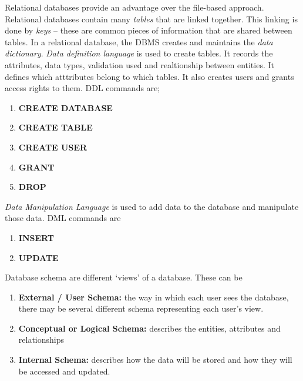 \documentclass{article}
\begin{document}
\noindent Relational databases provide an advantage over the file-based
approach. Relational databases contain many \textit{tables} that are linked
together. This linking is done by \textit{keys} -- these are common pieces of
information that are shared between tables. In a relational database, the DBMS
creates and maintains the \textit{data dictionary}. \textit{Data definition
language} is used to create tables. It records the attributes, data types,
validation used and realtionship between entities. It defines which atttributes
belong to which tables. It also creates users and grants access rights to them.
DDL commands are;\begin{enumerate}

    \item \textbf{CREATE DATABASE}
    
    \item \textbf{CREATE TABLE}
    
    \item \textbf{CREATE USER}
    
    \item \textbf{GRANT}
    
    \item \textbf{DROP}

\end{enumerate}

\noindent \textit{Data Manipulation Language} is used to add data to the
database and manipulate those data. DML commands are\begin{enumerate}

    \item \textbf{INSERT}
    
    \item \textbf{UPDATE}

\end{enumerate}

Database schema are different `views' of a database. These can
be\begin{enumerate}

    \item \textbf{External / User Schema:} the way in which each user sees the
        database, there may be several different schema representing each user's
        view.
    
    \item \textbf{Conceptual or Logical Schema:} describes the entities,
        attributes and relationships
    
    \item \textbf{Internal Schema:} describes how the data will be stored and
        how they will be accessed and updated.

\end{enumerate}
\end{document}
